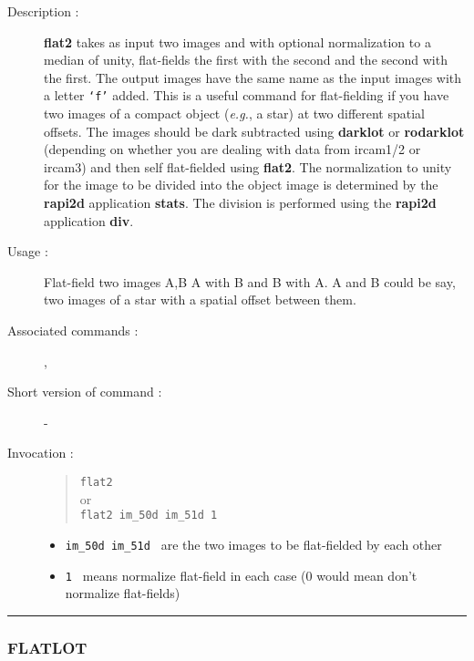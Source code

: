 \begin{description}

\item[Description :] {\bf flat2} takes as input two images and with
optional normalization to a median of unity, flat-fields the first with
the second and the second with the first.  The output images have the
same name as the input images with a letter {\tt `f'} added.  This is a
useful command for flat-fielding if you have two images of a compact
object (\emph{e.g.}, a star) at two different spatial offsets.  The
images should be dark subtracted using {\bf darklot} or {\bf rodarklot}
(depending on whether you are dealing with data from {\sc ircam1/2} or
{\sc ircam3}) and then self flat-fielded using {\bf flat2}. The
normalization to unity for the image to be divided into the object
image is determined by the {\bf rapi2d} application {\bf stats}.  The
division is performed using the {\bf rapi2d} application {\bf div}.

\item[Usage :] Flat-field two images A,B A with B and B with A.
A and B could be say, two images of a star with a spatial offset between them.
\item[Associated commands :] {\tt {}},
{\tt {}}
\item[Short version of command :] -
\item[Invocation :]

\begin{quote}{\tt  flat2 }\\
or \\
{\tt flat2 im\_50d im\_51d 1 }
\end{quote}

\begin{itemize}

\item {\tt im\_50d im\_51d } are the two images to be flat-fielded by
each other
\item {\tt 1 } means normalize flat-field in each case
(0 would mean don't normalize flat-fields)
\end{itemize}

\end{description}

\hrule
\subsubsection*{\label{FLATLOT}FLATLOT}

